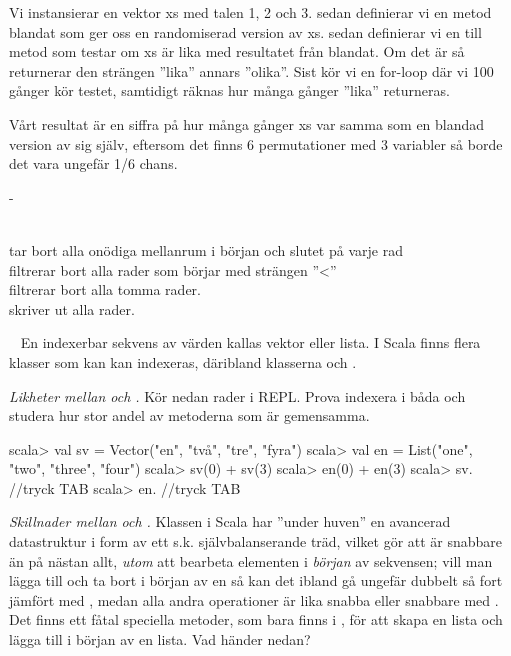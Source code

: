 {{\SOLUTION


\TaskSolved \what
 

\SubtaskSolved 
Vi instansierar en vektor xs med talen 1, 2 och 3.
sedan definierar vi en metod blandat som ger oss en randomiserad version av xs.
sedan definierar vi en till metod som testar om xs är lika med resultatet från blandat. Om det är så returnerar den strängen ''lika'' annars ''olika''.
Sist kör vi en for-loop där vi 100 gånger kör testet, samtidigt räknas hur många gånger ''lika'' returneras.

Vårt resultat är en siffra på hur många gånger xs var samma som en blandad version av sig själv, eftersom det finns 6 permutationer med 3 variabler så borde det vara ungefär 1/6 chans.

\SubtaskSolved  -

\SubtaskSolved 
\\  tar bort alla onödiga mellanrum i början och slutet på varje rad
\\  filtrerar bort alla rader som börjar med strängen ''<''
\\  filtrerar bort alla tomma rader.
\\  skriver ut alla rader.


\QUESTEND









\QUESTBEGIN

\Task  \what~  En indexerbar sekvens av värden kallas vektor eller lista. I Scala finns flera klasser som kan kan indexeras, däribland klasserna  och .

\Subtask \emph{Likheter mellan  och .} Kör nedan rader i REPL. Prova indexera i båda och studera hur stor andel av metoderna som är gemensamma.
\begin{REPL}
scala> val sv = Vector("en", "två", "tre", "fyra")
scala> val en = List("one", "two", "three", "four")
scala> sv(0) + sv(3)
scala> en(0) + en(3)
scala> sv. //tryck TAB
scala> en. //tryck TAB
\end{REPL}

\Subtask \emph{Skillnader mellan  och .} Klassen  i Scala har ''under huven'' en avancerad datastruktur i form av ett s.k. självbalanserande träd, vilket gör att  är snabbare än  på nästan allt, \emph{utom} att bearbeta elementen i \emph{början} av sekvensen; vill man lägga till och ta bort i början av en  så kan det ibland gå ungefär dubbelt så fort jämfört med , medan alla andra operationer är lika snabba eller snabbare med . Det finns ett fåtal speciella metoder, som bara finns i , för att skapa en lista och lägga till i början av en lista. Vad händer nedan?

}}
